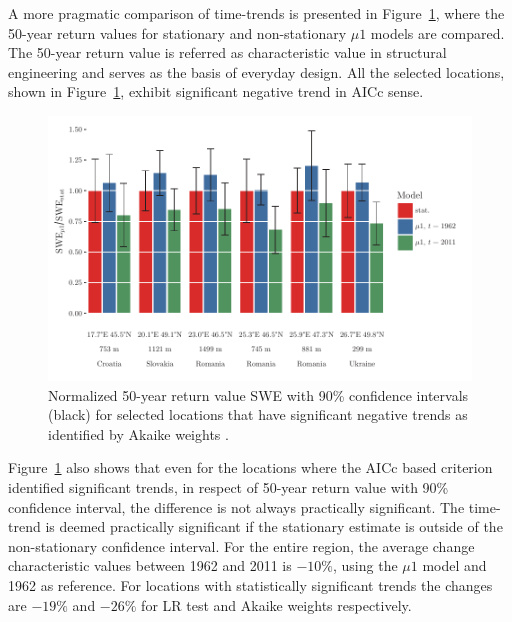 A more pragmatic comparison of time-trends is presented in Figure~\ref{fig:char_nonstat}, where the 50-year return values for stationary and non-stationary $\mu 1$ models are compared. The 50-year return value is referred as characteristic value in structural engineering and serves as the basis of everyday design. All the selected locations, shown in Figure~\ref{fig:char_nonstat}, exhibit significant negative trend in AICc sense.

\begin{figure}[htbp!]
	\centering
	\includegraphics[width=1\textwidth]{char_values_stat_nonstat.pdf}
	\caption[]{Normalized 50-year return value SWE with 90\% confidence intervals (black) for selected locations that have significant negative trends as identified by Akaike weights \mynote{\footnotemark}.}
	\label{fig:char_nonstat}
\end{figure}

Figure~\ref{fig:char_nonstat} also shows that even for the locations where the AICc based criterion identified significant trends, in respect of 50-year return value with 90\% confidence interval, the difference is not always practically significant. The time-trend is deemed practically significant if the stationary estimate is outside of the non-stationary confidence interval. For the entire region, the average change characteristic values between 1962 and 2011 is $-10\%$, using the $\mu 1$ model and 1962 as reference. For locations with statistically significant trends the changes are $-19\%$ and $-26\%$ for LR test and Akaike weights respectively.

